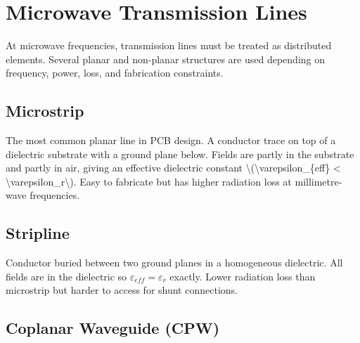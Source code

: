 \section{Microwave Transmission Lines}\label{sec:wiki_microwave_lines}



At microwave frequencies, transmission lines must be treated as distributed elements. Several planar and non-planar structures are used depending on frequency, power, loss, and fabrication constraints.

				

\subsection{Microstrip}

				


				

The most common planar line in PCB design. A conductor trace on top of a dielectric substrate with a ground plane below. Fields are partly in the substrate and partly in air, giving an effective dielectric constant \textbackslash{}(\textbackslash{}varepsilon\_\{eff\} \textless{} \textbackslash{}varepsilon\_r\textbackslash{}). Easy to fabricate but has higher radiation loss at millimetre-wave frequencies.


				

\subsection{Stripline}

				

Conductor buried between two ground planes in a homogeneous dielectric. All fields are in the dielectric so $\varepsilon_{eff} = \varepsilon_r$ exactly. Lower radiation loss than microstrip but harder to access for shunt connections.

				

\subsection{Coplanar Waveguide (CPW)}

